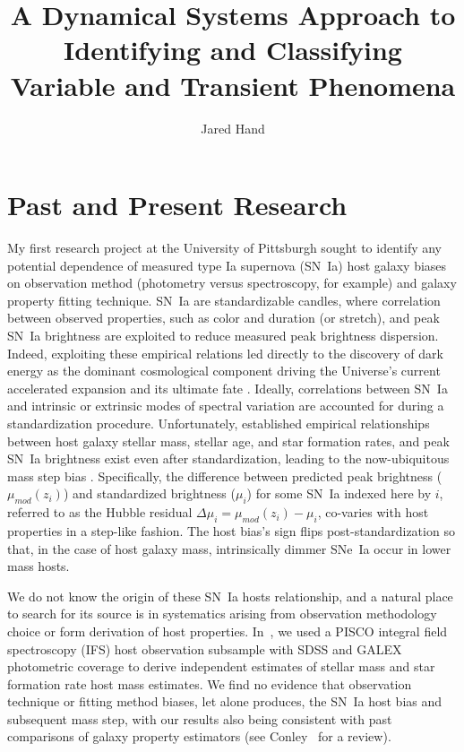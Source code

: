 \documentclass[modern]{aastex631}
\begin{document}
\title{A Dynamical Systems Approach to Identifying and Classifying Variable and Transient Phenomena}
\author[0000-0001-7260-4274]{Jared Hand}

\section{Past and Present Research}
My first research project at the University of Pittsburgh sought to identify any potential dependence of measured type Ia supernova (SN~Ia) host galaxy biases on observation method (photometry versus spectroscopy, for example) and galaxy property fitting technique.  
SN~Ia are standardizable candles, where correlation between observed properties, such as color and duration (or stretch), and peak SN~Ia brightness are exploited to reduce measured peak brightness dispersion. 
Indeed, exploiting these empirical relations led directly to the discovery of dark energy as the dominant cosmological component driving the Universe's current accelerated expansion and its ultimate fate \citep{Riess1998,Perlmutter99}. 
Ideally, correlations between SN~Ia and intrinsic or extrinsic modes of spectral variation are accounted for during a standardization procedure.  
Unfortunately, established empirical relationships between host galaxy stellar mass, stellar age, and star formation rates, and peak SN~Ia brightness exist even after standardization, leading to the now-ubiquitous mass step bias \citep{Sullivan10,Rigault18}. 
Specifically, the difference between predicted peak brightness ($\mu_{mod}(z_i)$) and standardized brightness ($\mu_i$) for some SN~Ia indexed here by $i$, referred to as the Hubble residual $\Delta \mu_i=\mu_{mod}(z_i) - \mu_i$, co-varies with host properties in a step-like fashion. 
The host bias's sign flips post-standardization so that, in the case of host galaxy mass, intrinsically dimmer SNe~Ia occur in lower mass hosts. 

We do not know the origin of these SN~Ia hosts relationship, and a natural place to search for its source is in systematics arising from observation methodology choice or form derivation of host properties. 
In~\cite{Hand2022}, we used a PISCO integral field spectroscopy (IFS) host observation subsample \citep{Galbany2018} with SDSS and GALEX photometric coverage \citep{Alam2018,Morrissey2007} to derive independent estimates of stellar mass and star formation rate host mass estimates. 
We find no evidence that observation technique or fitting method biases, let alone produces, the SN~Ia host bias and subsequent mass step, with our results also being consistent with past comparisons of galaxy property estimators (see Conley~\citeyear{Conroy2013} for a review). 
\end{document}
